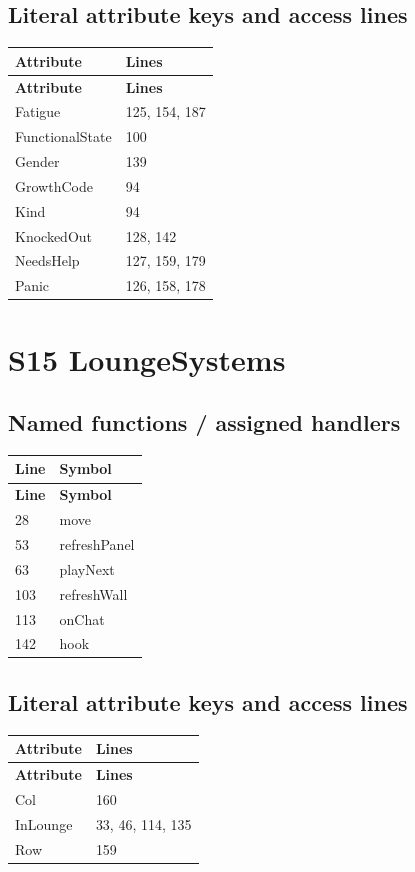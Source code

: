 \subsection{Literal attribute keys and access lines}
\begin{longtable}{p{}p{}}
\toprule
\textbf{Attribute} & \textbf{Lines} \\ \midrule
\endfirsthead
\textbf{Attribute} & \textbf{Lines} \\ \midrule
\endhead
Fatigue & 125, 154, 187 \\
FunctionalState & 100 \\
Gender & 139 \\
GrowthCode & 94 \\
Kind & 94 \\
KnockedOut & 128, 142 \\
NeedsHelp & 127, 159, 179 \\
Panic & 126, 158, 178 \\
\bottomrule
\end{longtable}
\section{S15 LoungeSystems}
\subsection{Named functions /\allowbreak{} assigned handlers}
\begin{longtable}{p{}p{}}
\toprule
\textbf{Line} & \textbf{Symbol} \\ \midrule
\endfirsthead
\textbf{Line} & \textbf{Symbol} \\ \midrule
\endhead
28 & move \\
53 & refreshPanel \\
63 & playNext \\
103 & refreshWall \\
113 & onChat \\
142 & hook \\
\bottomrule
\end{longtable}
\subsection{Literal attribute keys and access lines}
\begin{longtable}{p{}p{}}
\toprule
\textbf{Attribute} & \textbf{Lines} \\ \midrule
\endfirsthead
\textbf{Attribute} & \textbf{Lines} \\ \midrule
\endhead
Col & 160 \\
InLounge & 33, 46, 114, 135 \\
Row & 159 \\
\bottomrule
\end{longtable}

